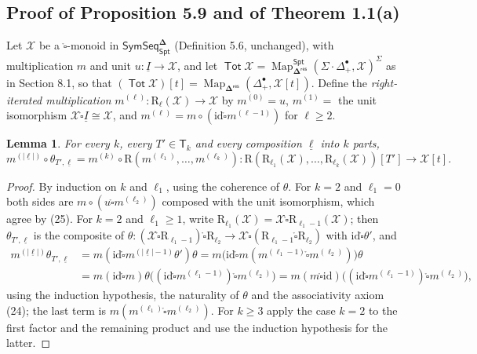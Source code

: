 \documentclass[12pt]{article}
\theoremstyle{plain}
\newtheorem{clemma}[ctheorem]{Lemma}
\theoremstyle{definition}
\theoremstyle{remark}
\newcommand{\Cal}[1]{\mathcal{#1}}
\newcommand{\Tot}{\operatorname{\mathsf{Tot}}}
\newcommand{\SymSeq}{\mathsf{SymSeq}}
\newcommand{\bdel}{\mathbf{\Delta}}
\newcommand{\Dres}{\bdel^{\mathsf{res}}}
\newcommand{\boxcirc}{\mathring{\square}}
\newcommand{\SD}{\Sigma{\cdot}\Delta^{\bullet}}
\newcommand{\id}{\mathrm{id}}
\newcommand{\Spt}{\mathsf{Spt}}
\newcommand{\Map}{\operatorname{Map}}
\newcommand{\Tr}{\mathsf{T}}
\newcommand{\Rr}{\mathrm{R}}
\begin{document}
\subsection{Proof of Proposition 5.9 and of Theorem 1.1(a)}
\label{sec:corr:prop59}

Let $\Cal X$ be a $\boxcirc$-monoid in $\SymSeq^{\bdel}_{\Spt}$ (Definition 5.6, unchanged), with multiplication $m$ and unit $u\colon\underline I\to\Cal X$, and let $\Tot\Cal X=\Map^{\Spt}_{\Dres}(\SD_+,\Cal X)^\Sigma$ as in Section 8.1, so that $(\Tot\Cal X)[t]=\Map_{\Dres}(\Delta^\bullet_+,\Cal X[t])$. Define the \emph{right-iterated multiplication} $m^{(\ell)}\colon\Rr_\ell(\Cal X)\to\Cal X$ by $m^{(0)}=u$, $m^{(1)}=$ the unit isomorphism $\Cal X\boxcirc\underline I\cong\Cal X$, and $m^{(\ell)}=m\circ(\id\boxcirc m^{(\ell-1)})$ for $\ell\geq2$.

\begin{clemma}\label{clem:iterated}
For every $k$, every $T'\in\Tr_k$ and every composition $\underline\ell$ into $k$ parts,
\[m^{(|\underline\ell|)}\circ\theta_{T',\underline\ell}=m^{(k)}\circ\Rr(m^{(\ell_1)},\dots,m^{(\ell_k)})\colon\Rr(\Rr_{\ell_1}(\Cal X),\dots,\Rr_{\ell_k}(\Cal X))[T']\longrightarrow\Cal X[t].\]
\end{clemma}

\begin{proof}
By induction on $k$ and $\ell_1$, using the coherence of $\theta$. For $k=2$ and $\ell_1=0$ both sides are $m\circ(u\boxcirc m^{(\ell_2)})$ composed with the unit isomorphism, which agree by (25). For $k=2$ and $\ell_1\geq1$, write $\Rr_{\ell_1}(\Cal X)=\Cal X\boxcirc\Rr_{\ell_1-1}(\Cal X)$; then $\theta_{T',\underline\ell}$ is the composite of $\theta\colon(\Cal X\boxcirc\Rr_{\ell_1-1})\boxcirc\Rr_{\ell_2}\to\Cal X\boxcirc(\Rr_{\ell_1-1}\boxcirc\Rr_{\ell_2})$ with $\id\boxcirc\theta'$, and
\begin{align*}
m^{(|\underline\ell|)}\theta_{T',\underline\ell}&=m(\id\boxcirc m^{(|\underline\ell|-1)}\theta')\theta=m\big(\id\boxcirc m(m^{(\ell_1-1)}\boxcirc m^{(\ell_2)})\big)\theta\\
&=m(\id\boxcirc m)\theta\big((\id\boxcirc m^{(\ell_1-1)})\boxcirc m^{(\ell_2)}\big)=m(m\boxcirc\id)\big((\id\boxcirc m^{(\ell_1-1)})\boxcirc m^{(\ell_2)}\big),
\end{align*}
using the induction hypothesis, the naturality of $\theta$ and the associativity axiom (24); the last term is $m(m^{(\ell_1)}\boxcirc m^{(\ell_2)})$. For $k\geq3$ apply the case $k=2$ to the first factor and the remaining product and use the induction hypothesis for the latter.
\end{proof}
\end{document}
